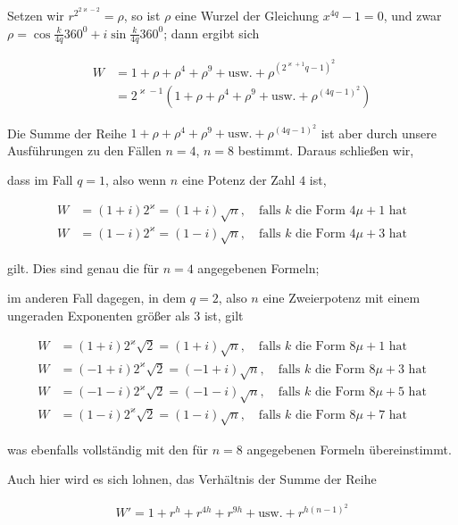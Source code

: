 Setzen wir $r^{2^{2\varkappa-2}}=\rho$, so ist $\rho$ eine Wurzel der Gleichung $x^{4q}-1=0$, und zwar $\rho=\cos\frac{k}{4q}360^0+i\sin\frac{k}{4q}360^0$; dann ergibt sich

\[
\begin{aligned}
W&=1+\rho+\rho^4+\rho^9+\text{usw.}+\rho^{(2^{\varkappa+1}q-1)^2}\\
&=2^{\varkappa-1}(1+\rho+\rho^4+\rho^9+\text{usw.}+\rho^{(4q-1)^2})
\end{aligned}
\]

Die Summe der Reihe $1+\rho+\rho^4+\rho^9+\text{usw.}+\rho^{(4q-1)^2}$ ist aber durch unsere Ausführungen zu den Fällen $n=4$, $n=8$ bestimmt. Daraus schließen wir,

dass im Fall $q=1$, also wenn $n$ eine Potenz der Zahl $4$ ist,

\[
\begin{aligned}
W&=(1+i)2^\varkappa=(1+i)\surd n,\quad\text{falls }k\text{ die Form }4\mu+1\text{ hat}\\
W&=(1-i)2^\varkappa=(1-i)\surd n,\quad\text{falls }k\text{ die Form }4\mu+3\text{ hat}
\end{aligned}
\]

gilt. Dies sind genau die für $n=4$ angegebenen Formeln;

im anderen Fall dagegen, in dem $q=2$, also $n$ eine Zweierpotenz mit einem ungeraden Exponenten größer als $3$ ist, gilt

\[
\begin{aligned}
W&=(1+i)2^\varkappa\surd2=(1+i)\surd n,\quad\text{falls }k\text{ die Form }8\mu+1\text{ hat}\\
W&=(-1+i)2^\varkappa\surd2=(-1+i)\surd n,\quad\text{falls }k\text{ die Form }8\mu+3\text{ hat}\\
W&=(-1-i)2^\varkappa\surd2=(-1-i)\surd n,\quad\text{falls }k\text{ die Form }8\mu+5\text{ hat}\\
W&=(1-i)2^\varkappa\surd2=(1-i)\surd n,\quad\text{falls }k\text{ die Form }8\mu+7\text{ hat}
\end{aligned}
\]

was ebenfalls vollständig mit den für $n=8$ angegebenen Formeln übereinstimmt.


Auch hier wird es sich lohnen, das Verhältnis der Summe der Reihe

\[
\begin{aligned}
W'=1+r^h+r^{4h}+r^{9h}+\text{usw.}+r^{h(n-1)^2}
\end{aligned}
\]


